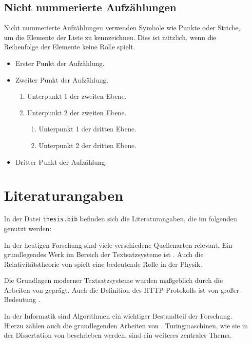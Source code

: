 \subsection*{Nicht nummerierte Aufzählungen}

Nicht nummerierte Aufzählungen verwenden Symbole wie Punkte oder Striche, um die
Elemente der Liste zu kennzeichnen. Dies ist nützlich, wenn die Reihenfolge der
Elemente keine Rolle spielt.

\begin{itemize}
  \item Erster Punkt der Aufzählung.
  \item Zweiter Punkt der Aufzählung.
  \begin{enumerate}
      \item Unterpunkt 1 der zweiten Ebene.
      \item Unterpunkt 2 der zweiten Ebene.
      \begin{enumerate}
          \item Unterpunkt 1 der dritten Ebene.
          \item Unterpunkt 2 der dritten Ebene.
      \end{enumerate}
  \end{enumerate}
  \item Dritter Punkt der Aufzählung.
\end{itemize}


\section*{Literaturangaben}

In der Datei \texttt{thesis.bib} befinden sich die Literaturangaben, die im
folgenden genutzt werden:

In der heutigen Forschung sind viele verschiedene Quellenarten relevant. Ein
grundlegendes Werk im Bereich der Textsatzsysteme ist
\textcite{knuth1984texbook}. Auch die Relativitätstheorie von
\textcite{einstein1905} spielt eine bedeutende Rolle in der Physik.

Die Grundlagen moderner Textsatzsysteme wurden maßgeblich durch die Arbeiten von
\textcite{lamport1986document} geprägt. Auch die Definition des HTTP-Protokolls
ist von großer Bedeutung \cite{rfc2616}.

In der Informatik sind Algorithmen ein wichtiger Bestandteil der Forschung.
Hierzu zählen auch die grundlegenden Arbeiten von \textcite{knuth1997art}.
Turingmaschinen, wie sie in der Dissertation von \textcite{hopcroft1971thesis}
beschrieben werden, sind ein weiteres zentrales Thema.

